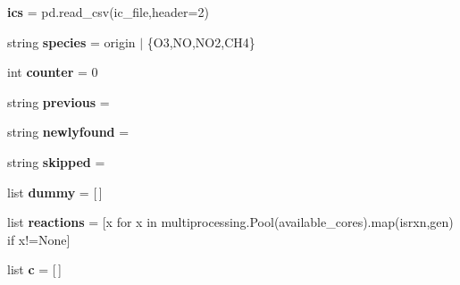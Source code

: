 \begin{DoxyCompactItemize}
\item 
\mbox{\label{namespaceMCM__subset__new_a28406875b8997ab9a3aa8ece321f8aa1}} 
{\bfseries ics} = pd.\+read\+\_\+csv(ic\+\_\+file,header=2)
\item 
\mbox{\label{namespaceMCM__subset__new_adb705a0821ea12962c3e112e60937fc4}} 
string {\bfseries species} = origin $\vert$ \{\textquotesingle{}O3\textquotesingle{},\textquotesingle{}NO\textquotesingle{},\textquotesingle{}N\+O2\textquotesingle{},\textquotesingle{}C\+H4\textquotesingle{}\}
\item 
\mbox{\label{namespaceMCM__subset__new_a2a0428c4989e09b6964575e9a35121ca}} 
int {\bfseries counter} = 0
\item 
\mbox{\label{namespaceMCM__subset__new_aa4338161d28e309b928a27796b77cd9d}} 
string {\bfseries previous} = \textquotesingle{}\textquotesingle{}
\item 
\mbox{\label{namespaceMCM__subset__new_a5c83ace8b0f17432a1fd9518eb3f4a31}} 
string {\bfseries newlyfound} = \textquotesingle{}\textquotesingle{}
\item 
\mbox{\label{namespaceMCM__subset__new_a86d17221ab89803030ddc3dea87597c4}} 
string {\bfseries skipped} = \textquotesingle{}\textquotesingle{}
\item 
\mbox{\label{namespaceMCM__subset__new_a67344f2ad33516537afd9a6341345504}} 
list {\bfseries dummy} = \mbox{[}$\,$\mbox{]}
\item 
\mbox{\label{namespaceMCM__subset__new_a5b52c405079b0ac42e433f883744d6e4}} 
list {\bfseries reactions} = \mbox{[}x for x in multiprocessing.\+Pool(available\+\_\+cores).map(isrxn,gen) if x!=None\mbox{]}
\item 
\mbox{\label{namespaceMCM__subset__new_a838e733371edfd89e3042bae6f43b255}} 
list {\bfseries c} = \mbox{[}$\,$\mbox{]}
\item 
\mbox{\label{namespaceMCM__subset__new_a92bb2732df8bf72f2b3facf7a5db466a}} 

\end{DoxyCompactItemize}
